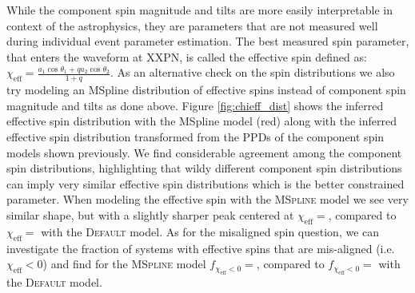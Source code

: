 While the component spin magnitude and tilts are more easily interpretable in context of the astrophysics, they are parameters that 
are not measured well during individual event parameter estimation. The best measured spin parameter, that enters the waveform at XXPN, is 
called the effective spin defined as: $\chi_\mathrm{eff} = \frac{a_1\cos{\theta_1} + qa_2\cos{\theta_2}}{1+q}$. As an alternative check 
on the spin distributions we also try modeling an MSpline distribution of effective spins instead of component spin magnitude and tilts 
as done above. Figure \ref{fig:chieff_dist} shows the inferred effective spin distribution with the MSpline model (red) along with the 
inferred effective spin distribution transformed from the PPDs of the component spin models shown previously. We find considerable agreement 
among the component spin distributions, highlighting that wildy different component spin distributions can imply very similar effective spin 
distributions which is the better constrained parameter. When modeling the effective spin with the \textsc{MSpline} model we see very similar 
shape, but with a slightly sharper peak centered at $\chi_\mathrm{eff}=$\result{$\CIPlusMinus{\macros[ChiEffective][chieff][PeakChiEff]}$}, compared to 
$\chi_\mathrm{eff}=$\result{$\CIPlusMinus{\macros[ChiEffective][default][PeakChiEff]}$} with the \textsc{Default} model. As for the misaligned spin question, 
we can investigate the fraction of systems with effective spins that are mis-aligned (i.e. $\chi_\mathrm{eff}<0$) and find for the \textsc{MSpline} 
model $f_{\chi_\mathrm{eff}<0}=$\result{$\CIPlusMinus{\macros[ChiEffective][chieff][FracBelow0]}$}, compared to $f_{\chi_\mathrm{eff}<0}=$\result{$\CIPlusMinus{\macros[ChiEffective][default][FracBelow0]}$} 
with the \textsc{Default} model.
